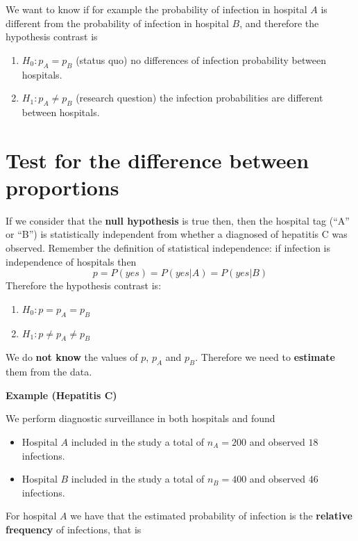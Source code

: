 \documentclass[
]{book}
\providecommand{\tightlist}{%
  \setlength{\itemsep}{0pt}\setlength{\parskip}{0pt}}
\begin{document}
We want to know if for example the probability of infection in hospital \(A\) is different from the probability of infection in hospital \(B\), and therefore the hypothesis contrast is

\begin{enumerate}
\def\labelenumi{\alph{enumi}.}
\tightlist
\item
  \(H_0: p_A=p_B\) (status quo) no differences of infection probability between hospitals.
\item
  \(H_1: p_A\neq p_B\) (research question) the infection probabilities are different between hospitals.
\end{enumerate}

\hypertarget{test-for-the-difference-between-proportions}{%
\section{Test for the difference between proportions}\label{test-for-the-difference-between-proportions}}

If we consider that the \textbf{null hypothesis} is true then, then the hospital tag (``A'' or ``B'') is statistically independent from whether a diagnosed of hepatitis C was observed. Remember the definition of statistical independence: if infection is independence of hospitals then
\[p=P(yes)=P(yes|A)=P(yes|B)\]
Therefore the hypothesis contrast is:

\begin{enumerate}
\def\labelenumi{\alph{enumi}.}
\tightlist
\item
  \(H_0: p=p_A=p_B\)
\item
  \(H_1: p\neq p_A \neq p_B\)
\end{enumerate}

We do \textbf{not know} the values of \(p\), \(p_A\) and \(p_B\). Therefore we need to \textbf{estimate} them from the data.

\textbf{Example (Hepatitis C)}

We perform diagnostic surveillance in both hospitals and found

\begin{itemize}
\item
  Hospital \(A\) included in the study a total of \(n_A=200\) and observed \(18\) infections.
\item
  Hospital \(B\) included in the study a total of \(n_B=400\) and observed \(46\) infections.
\end{itemize}

For hospital \(A\) we have that the estimated probability of infection is the \textbf{relative frequency} of infections, that is
\end{document}
